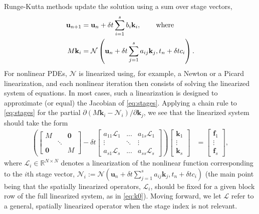 \documentclass[review]{siamart}
\begin{document}
Runge-Kutta methods update the solution using a sum over stage vectors,
%
\begin{align}\label{eq:update}
\mathbf{u}_{n+1} & = \mathbf{u}_n + \delta t \sum_{i=1}^s b_i\mathbf{k}_i,
	\hspace{5ex}\textnormal{where}\\
M\mathbf{k}_i & = \mathcal{N}\left(\mathbf{u}_n + \delta t\sum_{j=1}^s a_{ij}\mathbf{k}_j, t_n+\delta tc_i\right).\label{eq:stages}
\end{align}
%
For nonlinear PDEs, $\mathcal{N}$ is linearized using, for example, a Newton or a
Picard linearization, and each nonlinear iteration then consists of solving the
linearized system of equations. In most cases, such a linearization
is designed to approximate (or equal) the Jacobian of \eqref{eq:stages}. Applying
a chain rule to \eqref{eq:stages} for the partial
$\partial(M\mathbf{k}_i-\mathcal{N}_i)/\partial\mathbf{k}_j$, we see that
the linearized system should take the form
%
\begin{align}\label{eq:k0}
\left( \begin{bmatrix} M  & & \mathbf{0} \\ & \ddots \\ \mathbf{0} & & M\end{bmatrix}
	- \delta t \begin{bmatrix} a_{11}\mathcal{L}_1 & ... & a_{1s}\mathcal{L}_1 \\
	\vdots & \ddots & \vdots \\ a_{s1}\mathcal{L}_s & ... & a_{ss} \mathcal{L}_s \end{bmatrix} \right)
	\begin{bmatrix} \mathbf{k}_1 \\ \vdots \\ \mathbf{k}_s \end{bmatrix}
& = \begin{bmatrix} \mathbf{f}_1 \\ \vdots \\ \mathbf{f}_s \end{bmatrix},
\end{align}
%
where $\mathcal{L}_i\in\mathbb{R}^{N\times N}$
denotes a linearization of the nonlinear function
corresponding to the $i$th stage vector, $\mathcal{N}_i:= \mathcal{N}\left(\mathbf{u}_n +
\delta t\sum_{j=1}^s a_{ij}\mathbf{k}_j, t_n+\delta tc_i\right)$ (the main
point being that the spatially linearized operators, $\mathcal{L}_i$, should
be fixed for a given block row of the full linearized system, as in \eqref{eq:k0}).
Moving forward, we let $\mathcal{L}$ refer to a general, spatially linearized
operator when the stage index is not relevant.
\end{document}
